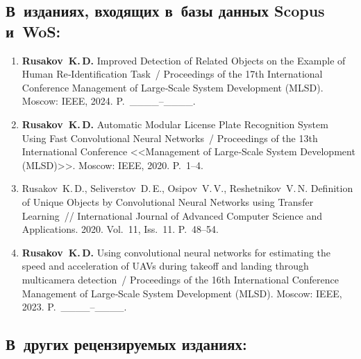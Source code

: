\subsection*{В~изданиях, входящих в~базы данных Scopus и~WoS:}

\begin{enumerate}[resume]
    \item \textbf{Rusakov~K.\,D.} Improved Detection of Related Objects on the
          Example of Human Re‑Identification Task~/ Proceedings of the 17th
          International Conference Management of Large‑Scale System Development
          (MLSD). Moscow: IEEE, 2024. P.~\_\_\_\_--\_\_\_\_.
    \item \textbf{Rusakov~K.\,D.} Automatic Modular License Plate Recognition
          System Using Fast Convolutional Neural Networks~/ Proceedings of the
          13th International Conference <<Management of Large‑Scale System
          Development (MLSD)>>. Moscow: IEEE, 2020. P.~1--4.
    \item Rusakov~K.\,D., Seliverstov~D.\,E., Osipov~V.\,V., Reshetnikov~V.\,N.
          Definition of Unique Objects by Convolutional Neural Networks using
          Transfer Learning~// International Journal of Advanced Computer
          Science and Applications. 2020. Vol.~11, Iss.~11. P.~48--54.
    \item \textbf{Rusakov~K.\,D.} Using convolutional neural networks for
          estimating the speed and acceleration of UAVs during takeoff and
          landing through multicamera detection~/ Proceedings of the 16th
          International Conference Management of Large‑Scale System Development
          (MLSD). Moscow: IEEE, 2023. P.~\_\_\_\_--\_\_\_\_.
\end{enumerate}

\subsection*{В~других рецензируемых изданиях:}

